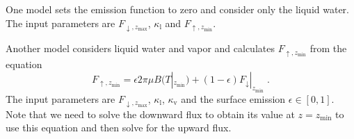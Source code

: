One model sets the emission function to zero and consider only the liquid water. The input parameters are $F_{\downarrow,z_\mathrm{max}}$, $\kappa_\mathrm{l}$ and $F_{\uparrow,z_\mathrm{min}}$.

Another model considers liquid water and vapor and calculates $F_{\uparrow,z_\mathrm{min}}$ from the equation
\begin{equation}
    F_{\uparrow,z_\mathrm{min}} = \epsilon 2\pi\mu B(T|_{z_\mathrm{min}})+(1-\epsilon)F_\downarrow|_{z_\mathrm{min}} \;.
\end{equation}
The input parameters are $F_{\downarrow,z_\mathrm{max}}$, $\kappa_\mathrm{l}$, $\kappa_\mathrm{v}$ and the surface emission $\epsilon\in[0,1]$. Note that we need to solve the downward flux to obtain its value at $z=z_\mathrm{min}$ to use this equation and then solve for the upward flux.


